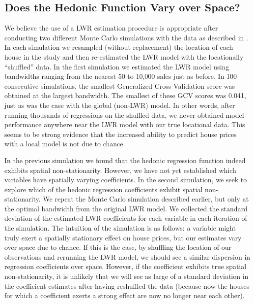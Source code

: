 \documentclass{article}\usepackage{graphicx, color}
\begin{document}
\subsection{Does the Hedonic Function Vary over Space?}
We believe the use of a LWR estimation procedure is appropriate after conducting two different Monte Carlo simulations with the data as described in \citet{Fotheringham2002}. In each simulation we resampled (without replacement) the location of each house in the study and then re-estimated the LWR model with the locationally ``shuffled'' data. In the first simulation we estimated the LWR model using bandwidths ranging from the nearest 50 to 10,000 sales just as before. In 100 consecutive simulations, the smallest Generalized Cross-Validation score was obtained at the largest bandwidth. The smallest of these GCV scores was 0.041, just as was the case with the global (non-LWR) model. In other words, after running thousands of regressions on the shuffled data, we never obtained model performance anywhere near the LWR model with our true locational data. This seems to be strong evidence that the increased ability to predict house prices with a local model is not due to chance. 

In the previous simulation we found that the hedonic regression function indeed exhibits spatial non-stationarity. However, we have not yet established which variables have spatially varying coefficients. In the second simulation, we seek to explore which of the hedonic regression coefficients exhibit spatial non-stationarity. We repeat the Monte Carlo simulation described earlier, but only at the optimal bandwidth from the original LWR model. We collected the standard deviation of the estimated LWR coefficients for each variable in each iteration of the simulation. The intuition of the simulation is as follows: a variable might truly exert a spatially stationary effect on house prices, but our estimates vary over space due to chance. If this is the case, by shuffling the location of our observations and rerunning the LWR model, we should see a similar dispersion in regression coefficients over space. However, if the coefficient exhibits true spatial non-stationarity, it is unlikely that we will see as large of a standard deviation in the coefficient estimates after having reshuffled the data (because now the houses for which a coefficient exerts a strong effect are now no longer near each other). 
\end{document}

